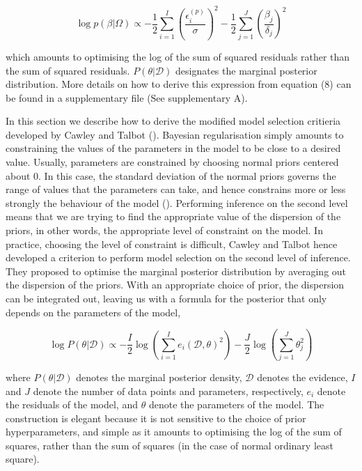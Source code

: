 \documentclass[11pt, oneside]{article}
\begin{document}
\vspace{-0.5cm}
\begin{equation}
    \log p(\beta | \Omega) \propto - \frac{1}{2} \sum_{i=1}^{I} \left( \frac{\epsilon^{(p)}_i}{\sigma} \right)^2 - \frac{1}{2} \sum_{j=1}^{J} \left( \frac{\beta_j}{\delta_j} \right)^2
\end{equation}


which amounts to optimising the log of the sum of squared residuals rather than the sum of squared residuals. $P(\theta | \mathcal{D})$ designates the marginal posterior distribution. 
More details on how to derive this expression from equation (8) can be found in a supplementary file (See supplementary A).

In this section we describe how to derive the modified model selection critieria developed by Cawley and Talbot (\cite{Cawley2007}).
Bayesian regularisation simply amounts to constraining the values of the parameters in the model to be close to a desired value. 
Usually, parameters are constrained by choosing normal priors centered about 0.
In this case, the standard deviation of the normal priors governs the range of values that the parameters can take, and hence constrains more or less strongly the behaviour of the model (\cite{Cawley2007}).
Performing inference on the second level means that we are trying to find the appropriate value of the dispersion of the priors, in other words, the appropriate level of constraint on the model. 
In practice, choosing the level of constraint is difficult, Cawley and Talbot hence developed a criterion to perform model selection on the second level of inference.
They proposed to optimise the marginal posterior distribution by averaging out the dispersion of the priors.
With an appropriate choice of prior, the dispersion can be integrated out, leaving us with a formula for the posterior that only depends on the parameters of the model,

\begin{equation}
	\log P(\theta | \mathcal{D}) \propto - \frac{I}{2} \log \left(\sum_{i=1}^{I} e_i(\mathcal{D},\theta)^2\right) - \frac{J}{2} \log \left(\sum_{j=1}^{J} \theta_{j}^2 \right)
\end{equation}

where $P(\theta|\mathcal{D})$ denotes the marginal posterior density, $\mathcal{D}$ denotes the evidence, $I$ and $J$ denote the number of data points and parameters, respectively, $e_i$ denote the residuals of the model, and $\theta$ denote the parameters of the model.
The construction is elegant because it is not sensitive to the choice of prior hyperparameters, and simple as it amounts to optimising the log of the sum of squares, rather than the sum of squares (in the case of normal ordinary least square).
\end{document}
